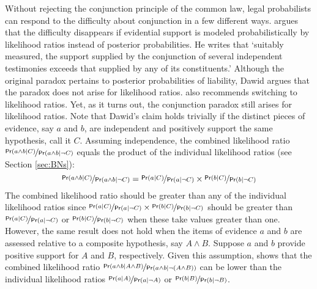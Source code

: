 \documentclass{article}
\newcommand{\pr}{\mathsf{Pr}}
\begin{document}
Without rejecting the conjunction principle of the common law, legal probabilists can respond to the difficulty about conjunction in a few different ways. 
\citet{dawid1987difficulty} 
argues that the difficulty disappears if evidential support is modeled probabilistically by likelihood ratios instead of posterior probabilities. 
He writes that 
`suitably measured, the support supplied by the conjunction of several independent testimonies exceeds that supplied by any of its constituents.' %
 Although the original paradox pertains to  posterior probabilities of liability, Dawid argues that the  paradox does not arise for likelihood ratios. %
 \cite{garbolino2014} also recommends switching to likelihood ratios. %
 Yet, as it turns out, the conjunction paradox   still arises for likelihood ratios. Note that Dawid's claim 
 holds trivially if the distinct pieces of evidence, say $a$ and $b$, are independent and positively support the same hypothesis, call it $C$. Assuming independence, the combined likelihood ratio $\nicefrac{\pr(a \wedge b | C)}{\pr(a\wedge b | \neg C)}$ equals  the product of the individual likelihood ratios (see Section \ref{sec:BNs}):
 \[\nicefrac{\pr(a \wedge b | C)}{\pr(a\wedge b | \neg C)} = \nicefrac{\pr(a | C)}{\pr(a | \neg C)} \times \nicefrac{\pr(b | C)}{\pr(b | \neg C)}\]
The combined likelihood ratio should be greater than any of the individual likelihood ratios since $\nicefrac{\pr(a | C)}{\pr(a | \neg C)} \times \nicefrac{\pr(b | C)}{\pr(b | \neg C)}$ should be greater than  $\nicefrac{\pr(a | C)}{\pr(a | \neg C)}$ or $\nicefrac{\pr(b | C)}{\pr(b | \neg C)}$ when these take values greater than one. However, the same result does not hold when the items of evidence $a$ and $b$ are assessed relative to a composite hypothesis, say $A \wedge B$. Suppose $a$ and $b$ provide positive support for  $A$ and $B$, respectively.  Given this assumption, \cite{Urbaniak2019standards2} shows that the combined likelihood ratio $\nicefrac{\pr(a \wedge b | A\wedge B)}{\pr(a\wedge b | \neg (A \wedge B))}$ can be lower than the individual likelihood ratios $\nicefrac{\pr(a | A)}{\pr(a | \neg A)}$ or $\nicefrac{\pr(b | B)}{\pr(b | \neg B)}$.
\end{document}
